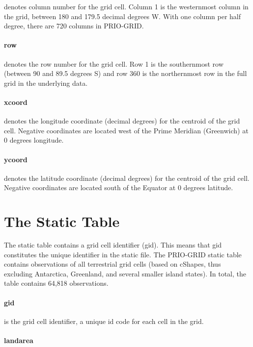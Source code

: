 \documentclass[]{book}
\begin{document}
denotes column number for the grid cell. Column 1 is the westernmost
column in the grid, between 180 and 179.5 decimal degrees W. With one
column per half degree, there are 720 columns in PRIO-GRID.

\paragraph{row}\label{row}

denotes the row number for the grid cell. Row 1 is the southernmost row
(between 90 and 89.5 degrees S) and row 360 is the northernmost row in
the full grid in the underlying data.

\paragraph{xcoord}\label{xcoord}

denotes the longitude coordinate (decimal degrees) for the centroid of
the grid cell. Negative coordinates are located west of the Prime
Meridian (Greenwich) at 0 degrees longitude.

\paragraph{ycoord}\label{ycoord}

denotes the latitude coordinate (decimal degrees) for the centroid of
the grid cell. Negative coordinates are located south of the Equator at
0 degrees latitude.

\section{The Static Table}\label{the-static-table}

The static table contains a grid cell identifier (gid). This means that
gid constitutes the unique identifier in the static file. The PRIO-GRID
static table contains observations of all terrestrial grid cells (based
on cShapes, thus excluding Antarctica, Greenland, and several smaller
island states). In total, the table contains 64,818 observations.

\paragraph{gid}\label{gid-1}

is the grid cell identifier, a unique id code for each cell in the grid.

\paragraph{landarea}\label{landarea}
\end{document}
